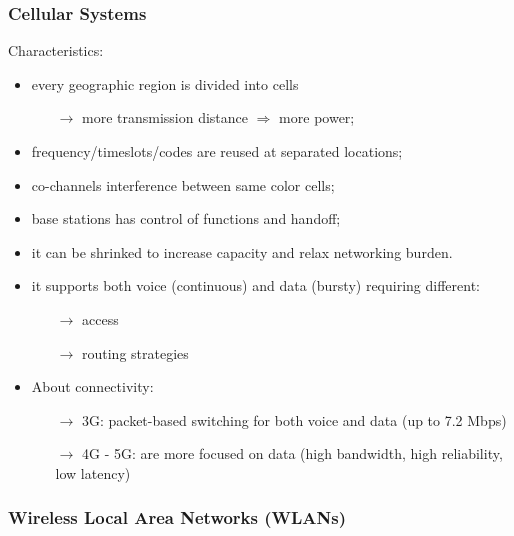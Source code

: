 \subsubsection{Cellular Systems}
Characteristics:
\begin{itemize}
    \setlength\itemsep{0.7em}
    \item every geographic region is divided into cells
    \begin{itemize}
        \item [$\rightarrow$] more transmission distance $\Rightarrow$
        more power;
    \end{itemize}
    \item frequency/timeslots/codes are reused at separated locations;
    \item co-channels interference between same color cells;
    \item base stations has control of functions and handoff;
    \item it can be shrinked to increase capacity and
    relax networking burden.
    \item it supports both voice (continuous) and data (bursty) requiring
    different:
    \begin{itemize}
        \item[$\rightarrow$] access
        \item[$\rightarrow$] routing strategies 
    \end{itemize}
    \item About connectivity:
    \begin{itemize}
        \item[$\rightarrow$] 3G: packet-based switching for both voice
        and data (up to 7.2 Mbps)
        \item[$\rightarrow$] 4G - 5G: are more focused on data
        (high bandwidth, high reliability, low latency)
    \end{itemize}
\end{itemize}

\subsubsection{Wireless Local Area Networks (WLANs)}


